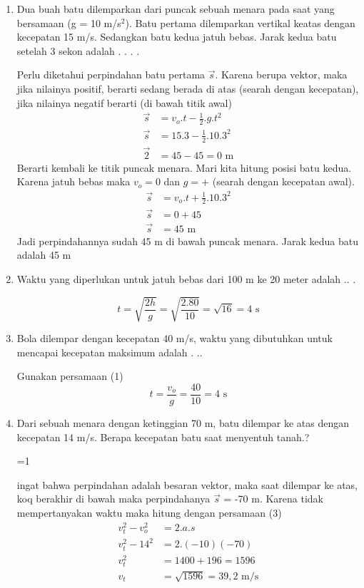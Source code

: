 \documentclass[10pt,a4paper]{article}
\def\tampilkunci{1}
\newcommand{\hide}[1]{\ifnum\tampilkunci=1
%
\begin{mybox}
 #1
\end{mybox}
%
\fi}
\newcommand{\unhide}[1]{
\begin{mybox}
#1\end{mybox}}
\begin{document}
\begin{multicols*}{2}
\begin{enumerate}[topsep=0pt,itemsep=0pt,leftmargin=*]
\item Dua buah batu dilemparkan dari puncak sebuah menara pada saat yang bersamaan (g = 10 m/s$^2$). Batu pertama dilemparkan vertikal keatas dengan kecepatan 15 m/s. Sedangkan batu kedua jatuh bebas. Jarak kedua batu setelah 3 sekon adalah . . . .
\unhide{
Perlu diketahui perpindahan batu pertama $\vec{s}$. Karena berupa vektor, maka jika nilainya positif, berarti sedang berada di atas (searah dengan kecepatan), jika nilainya negatif berarti (di bawah titik awal)
\begin{align*}
\vec{s} &= v_o.t-\frac{1}{2}.g.t^2\\
\vec{s} &= 15.3 - \frac{1}{2}.10.3^2\\
\vec{2} &=45-45 =0 \text{ m}
\end{align*} 
Berarti kembali ke titik puncak menara. Mari kita hitung posisi batu kedua. Karena jatuh bebas maka $v_o=0$ dan $g=+$ (searah dengan kecepatan awal). 
\begin{align*}
\vec{s} &= v_o.t+\frac{1}{2}.10.3^2\\
\vec{s} &= 0 + 45\\
\vec{s} &= 45 \text{ m}
\end{align*}
Jadi perpindahannya sudah 45 m di bawah puncak menara. Jarak kedua batu adalah 45 m
}

\item Waktu yang diperlukan untuk jatuh bebas dari 100 m ke 20 meter adalah .. .
\unhide{
$$t=\sqrt{\frac{2h}{g}}=\sqrt{\frac{2.80}{10}}=\sqrt{16} = 4 \text{ s}$$}

\item Bola dilempar dengan kecepatan 40 m/s, waktu yang dibutuhkan untuk mencapai kecepatan maksimum adalah . .. 
\unhide{
Gunakan persamaan (1)
$$t=\frac{v_o}{g} = \frac{40}{10}=4\text{ s}$$}

\item Dari sebuah menara dengan ketinggian 70 m, batu dilempar ke atas dengan kecepatan 14 m/s. Berapa kecepatan batu saat menyentuh tanah.?

\hide{ ingat bahwa perpindahan adalah besaran vektor, maka saat dilempar ke atas, koq berakhir di bawah maka perpindahanya $\vec{s}$ = -70 m. Karena tidak mempertanyakan waktu maka hitung dengan persamaan (3)
\begin{align*}
v_t^2 - v_o^2 &= 2.a.s\\
v_t^2 - 14^2 &= 2.(-10)(-70)\\
v_t^2 &= 1400+196 = 1596 \\
v_t &= \sqrt {1596} = 39,2 \text{ m/s}
\end{align*}}


\end{enumerate}


\end{multicols*}

 
\end{document}
